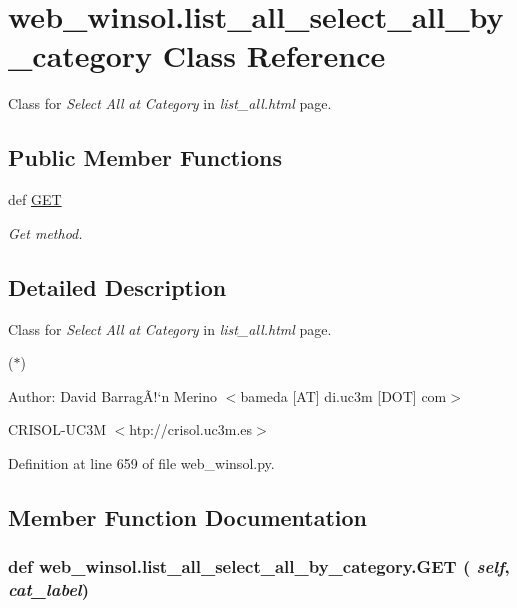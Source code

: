 \hypertarget{classweb__winsol_1_1list__all__select__all__by__category}{
\section{web\_\-winsol.list\_\-all\_\-select\_\-all\_\-by\_\-category Class Reference}
\label{classweb__winsol_1_1list__all__select__all__by__category}
}
Class for {\em Select\/} {\em All\/} {\em at\/} {\em Category\/} in {\em list\_\-all.html\/} page.  


\subsection*{Public Member Functions}
\begin{CompactItemize}
\item 
def \hyperlink{classweb__winsol_1_1list__all__select__all__by__category_00eeed0955b691bd8cc693948f09cf91}{GET}
\begin{CompactList}\small\item\em Get method. \item\end{CompactList}\end{CompactItemize}


\subsection{Detailed Description}
Class for {\em Select\/} {\em All\/} {\em at\/} {\em Category\/} in {\em list\_\-all.html\/} page. 

({\bf $\ast$})

\begin{Desc}
\item[Author:]David Barrag\~{A}!`n Merino $<$bameda \mbox{[}AT\mbox{]} di.uc3m \mbox{[}DOT\mbox{]} com$>$ 

CRISOL-UC3M $<$htp://crisol.uc3m.es$>$ \end{Desc}




Definition at line 659 of file web\_\-winsol.py.

\subsection{Member Function Documentation}
\hypertarget{classweb__winsol_1_1list__all__select__all__by__category_00eeed0955b691bd8cc693948f09cf91}{
\subsubsection[GET]{\setlength{\rightskip}{0pt plus 5cm}def web\_\-winsol.list\_\-all\_\-select\_\-all\_\-by\_\-category.GET ( {\em self},  {\em cat\_\-label})}}
\label{classweb__winsol_1_1list__all__select__all__by__category_00eeed0955b691bd8cc693948f09cf91}



